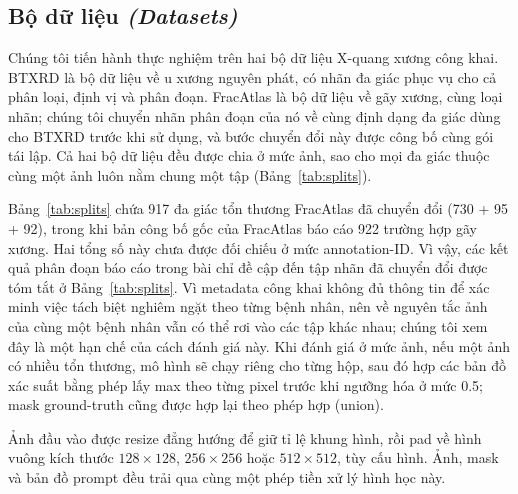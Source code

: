 \documentclass[11pt]{article}
\newcommand{\enlabel}[1]{{\small\itshape\color{gray} (#1)}}
\begin{document}
\subsection{Bộ dữ liệu \enlabel{Datasets}}
Chúng tôi tiến hành thực nghiệm trên hai bộ dữ liệu X-quang xương công khai. BTXRD là bộ dữ liệu về u xương nguyên phát, có nhãn đa giác phục vụ cho cả phân loại, định vị và phân đoạn. FracAtlas là bộ dữ liệu về gãy xương, cùng loại nhãn; chúng tôi chuyển nhãn phân đoạn của nó về cùng định dạng đa giác dùng cho BTXRD trước khi sử dụng, và bước chuyển đổi này được công bố cùng gói tái lập. Cả hai bộ dữ liệu đều được chia ở mức ảnh, sao cho mọi đa giác thuộc cùng một ảnh luôn nằm chung một tập (Bảng~\ref{tab:splits}).

\begin{table}[H]
\caption{Tập chia train / validation / test ở mức ảnh. Mỗi đa giác tổn thương là một mẫu có thể prompt.}
\label{tab:splits}
\centering
\scriptsize
{}
\end{table}

Bảng~\ref{tab:splits} chứa 917 đa giác tổn thương FracAtlas đã chuyển đổi (730 + 95 + 92), trong khi bản công bố gốc của FracAtlas báo cáo 922 trường hợp gãy xương. Hai tổng số này chưa được đối chiếu ở mức annotation-ID. Vì vậy, các kết quả phân đoạn báo cáo trong bài chỉ đề cập đến tập nhãn đã chuyển đổi được tóm tắt ở Bảng~\ref{tab:splits}. Vì metadata công khai không đủ thông tin để xác minh việc tách biệt nghiêm ngặt theo từng bệnh nhân, nên về nguyên tắc ảnh của cùng một bệnh nhân vẫn có thể rơi vào các tập khác nhau; chúng tôi xem đây là một hạn chế của cách đánh giá này. Khi đánh giá ở mức ảnh, nếu một ảnh có nhiều tổn thương, mô hình sẽ chạy riêng cho từng hộp, sau đó hợp các bản đồ xác suất bằng phép lấy max theo từng pixel trước khi ngưỡng hóa ở mức 0.5; mask ground-truth cũng được hợp lại theo phép hợp (union).

Ảnh đầu vào được resize đẳng hướng để giữ tỉ lệ khung hình, rồi pad về hình vuông kích thước $128\times128$, $256\times256$ hoặc $512\times512$, tùy cấu hình. Ảnh, mask và bản đồ prompt đều trải qua cùng một phép tiền xử lý hình học này.
\end{document}
